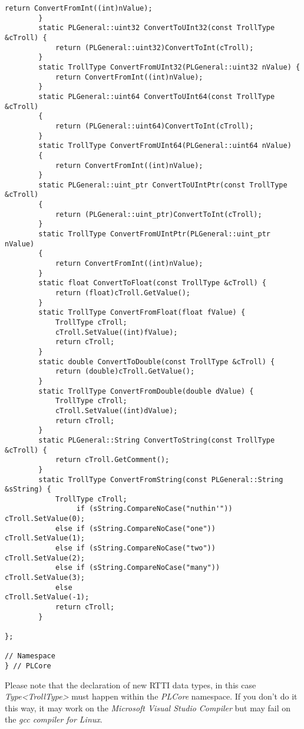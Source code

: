 \begin{lstlisting}[label=Code:UserDefinedRTTIDataTypeInline,caption={Inline of the user defined RTTI data type}]
			return ConvertFromInt((int)nValue);
		}
		static PLGeneral::uint32 ConvertToUInt32(const TrollType &cTroll) {
			return (PLGeneral::uint32)ConvertToInt(cTroll);
		}
		static TrollType ConvertFromUInt32(PLGeneral::uint32 nValue) {
			return ConvertFromInt((int)nValue);
		}
		static PLGeneral::uint64 ConvertToUInt64(const TrollType &cTroll)
		{
			return (PLGeneral::uint64)ConvertToInt(cTroll);
		}
		static TrollType ConvertFromUInt64(PLGeneral::uint64 nValue)
		{
			return ConvertFromInt((int)nValue);
		}
		static PLGeneral::uint_ptr ConvertToUIntPtr(const TrollType &cTroll)
		{
			return (PLGeneral::uint_ptr)ConvertToInt(cTroll);
		}
		static TrollType ConvertFromUIntPtr(PLGeneral::uint_ptr nValue)
		{
			return ConvertFromInt((int)nValue);
		}
		static float ConvertToFloat(const TrollType &cTroll) {
			return (float)cTroll.GetValue();
		}
		static TrollType ConvertFromFloat(float fValue) {
			TrollType cTroll;
			cTroll.SetValue((int)fValue);
			return cTroll;
		}
		static double ConvertToDouble(const TrollType &cTroll) {
			return (double)cTroll.GetValue();
		}
		static TrollType ConvertFromDouble(double dValue) {
			TrollType cTroll;
			cTroll.SetValue((int)dValue);
			return cTroll;
		}
		static PLGeneral::String ConvertToString(const TrollType &cTroll) {
			return cTroll.GetComment();
		}
		static TrollType ConvertFromString(const PLGeneral::String &sString) {
			TrollType cTroll;
				 if (sString.CompareNoCase("nuthin'"))	cTroll.SetValue(0);
			else if (sString.CompareNoCase("one"))		cTroll.SetValue(1);
			else if (sString.CompareNoCase("two"))		cTroll.SetValue(2);
			else if (sString.CompareNoCase("many"))		cTroll.SetValue(3);
			else										cTroll.SetValue(-1);
			return cTroll;
		}

};

// Namespace
} // PLCore
\end{lstlisting}
Please note that the declaration of new RTTI data types, in this case \emph{Type<TrollType>} must happen within the \emph{PLCore} namespace. If you don't do it this way, it may work on the \emph{Microsoft Visual Studio Compiler} but may fail on the \emph{gcc compiler for Linux}.


